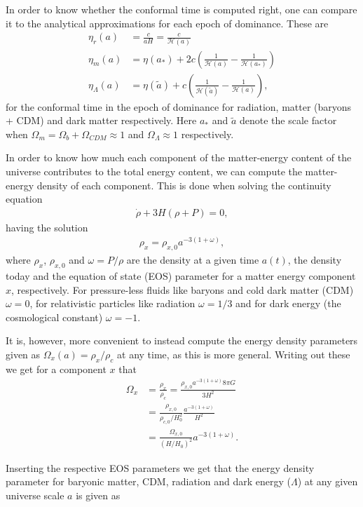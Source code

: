 \documentclass[twocolumn]{aastex62}
\begin{document}
In order to know whether the conformal time is computed right, one can compare it
to the analytical approximations for each epoch of dominance. These are 
\begin{align}
    \eta_r(a) &= \frac{c}{aH} = \frac{c}{\mathcal{H}(a)}\\
    \eta_m(a) &= \eta(a_*) + 2c\left(\frac{1}{\mathcal{H}(a)} - \frac{1}{\mathcal{H}(a_*)}\right)\\
    \eta_\Lambda(a) &= \eta(\tilde{a}) + c\left(\frac{1}{\mathcal{H}(\tilde{a})} - \frac{1}{\mathcal{H}(a)}\right),
\end{align}
for the conformal time in the epoch of dominance for radiation, matter (baryons
+ CDM) and dark matter respectively. Here $a_*$ and $\tilde{a}$ denote the scale
factor when $\Omega_m  = \Omega_b + \Omega_{CDM} \approx 1$ and $\Omega_\Lambda \approx 1$ respectively.

In order to know how much each component of the matter-energy content of the
universe contributes to the total energy content, we can compute the
matter-energy density of each component. This is done when solving the
continuity equation 
\begin{align}
    \dot{\rho} + 3H(\rho + P) = 0,
\end{align}
having the solution 
\begin{align}
    \rho_{x} = \rho_{x,0} a^{-3(1+\omega)},
\end{align}
where $\rho_x$, $\rho_{x,0}$ and $\omega = P/\rho$ are the density at a given
time $a(t)$, the density today and the equation of state (EOS) parameter for a
matter energy component $x$, respectively. For pressure-less fluids like baryons
and cold dark matter (CDM) $\omega = 0$, for relativistic particles like
radiation $\omega = 1/3$ and for dark energy (the cosmological constant) $\omega
= -1$. 

It is, however, more convenient to instead compute the energy density parameters
given as 
$\Omega_x(a) = \rho_x / \rho_c$ at any time, as this is more general. Writing out these we get for a
component $x$ that 
\begin{align}
    \Omega_x &= \frac{\rho_x}{\rho_c} = \frac{\rho_{x,0}a^{-3(1+\omega)} 8\pi G}{3 H^2} \\
   &= \frac{\rho_{x,0}}{\rho_{c,0}/H_0^2} \frac{a^{-3(1+\omega)}}{H^2} \\ 
   &= \frac{\Omega_{x,0}}{(H/H_0)^2} a^{-3(1+\omega)}.
\end{align}

Inserting the respective EOS parameters we get that the energy density parameter
for baryonic matter, CDM, radiation and dark energy ($\Lambda$)
at any given universe scale $a$ is given as
\end{document}
